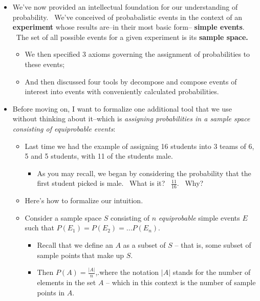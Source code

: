 \documentclass[11pt]{article}
\begin{document}
\begin{itemize}
\item We've now provided an intellectual foundation for our understanding of
probability. \ We've conceived of probabalistic events in the context of an 
\textbf{experiment }whose results are--in their most basic form--\textbf{%
simple events}. \ The set of all possible events for a given experiment is
its \textbf{sample space. \ }

\begin{itemize}
\item We then specified 3 axioms governing the assignment of probabilities
to these events;

\item And then discussed four tools by decompose and compose events of
interest into events with conveniently calculated probabilities.
\end{itemize}

\item Before moving on, I want to formalize one additional tool that we use
without thinking about it--which is \textit{assigning probabilities in a
sample space consisting of equiprobable events}:

\begin{itemize}
\item Last time we had the example of assigning 16 students into 3 teams of
6, 5 and 5 students, with 11 of the students male.

\begin{itemize}
\item As you may recall, we began by considering the probability that the
first student picked is male. \ What is it? \ $\frac{11}{16}.$ \ Why?
\end{itemize}

\item Here's how to formalize our intuition. \ 

\item Consider a sample space $S$ consisting of $n$ \textit{equiprobable}
simple events $E$ such that $P\left( E_{1}\right) =P\left( E_{2}\right)
=...P\left( E_{n}\right) .$

\begin{itemize}
\item Recall that we define an $A$ as a subset of $S$ -- that is, some
subset of sample points$\ $that make up $S$.\ 

\item Then $P(A)=\frac{|A|}{n}$,.where the notation $|A|$ stands for the
number of elements in the set $A$ -- which in this context is the number of
sample points in $A.$
\end{itemize}


\end{itemize}
\end{itemize}
\end{document}
